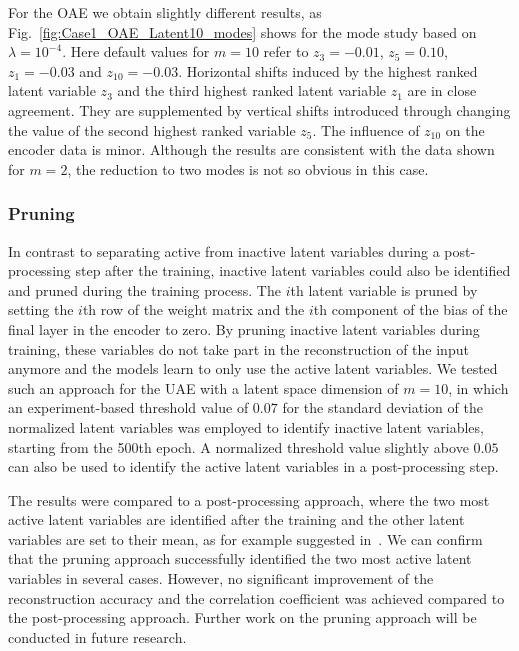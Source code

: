 For the OAE we obtain slightly different results, as Fig.~\ref{fig:Case1_OAE_Latent10_modes} shows for the mode study based on $\lambda=10^{-4}$. Here default values for $m=10$ refer to {$z_3=-0.01$, $z_5=0.10$, $z_{1}=-0.03$ and $z_{10}=-0.03$}.
Horizontal shifts induced by the highest ranked latent variable $z_3$ and the third highest ranked latent variable $z_1$ are in close agreement. They are supplemented by vertical shifts introduced through changing the value of the second highest ranked variable $z_5$. The influence of $z_{10}$ on the encoder data is minor. Although the results are consistent with the data shown for $m=2$, the reduction to two modes is not so obvious in this case. 


\subsubsection{Pruning}
In contrast to separating active from inactive latent variables during a post-processing step after the training, inactive latent variables could also be identified and pruned during the training process. 
%
The $i$th latent variable is pruned by setting the $i$th row of the weight matrix and the $i$th component of the bias of the final layer in the encoder to zero. By pruning inactive latent variables during training, these variables do not take part in the reconstruction of the input anymore and the models learn to only use the active latent variables. We tested such an approach for the UAE with a latent space dimension of $m=10$, in which an experiment-based threshold value of $0.07$ for the standard deviation of the normalized latent variables was employed to identify inactive latent variables, starting from the 500th epoch. A normalized threshold value slightly above $0.05$ can also be used to identify the active latent variables in a post-processing step.

The results were compared to a post-processing approach, where the two most active latent variables are identified after the training and the other latent variables are set to their mean, as for example suggested in~\cite{kang:2022}. 
We can confirm that the pruning approach successfully identified the two most active latent variables in several cases. 
However, no significant improvement of the reconstruction accuracy and the correlation coefficient was achieved compared to the post-processing approach. Further work on the pruning approach will be conducted in future research.

